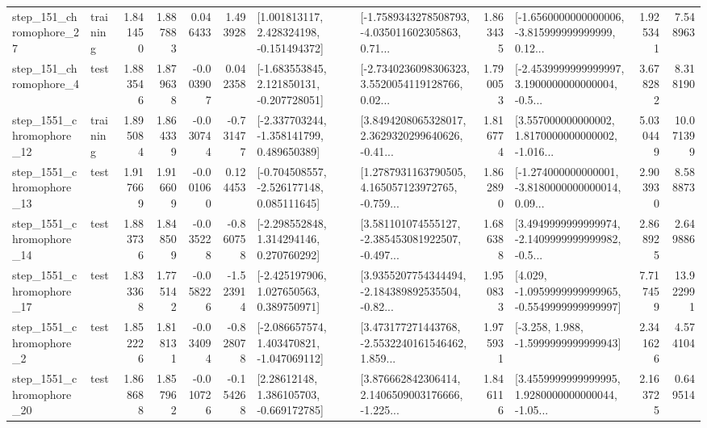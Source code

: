 \begin{tabular}{llrrrrllrlrr}
  step\_151\_chromophore\_27 &  training &      1.841450 &    1.887883 &      0.046433 &  1.493928 &    [1.001813117, 2.428324198, -0.151494372] &  [-1.7589343278508793, -4.035011602305863, 0.71... &       1.863435 &  [-1.6560000000000006, -3.815999999999999, 0.12... &            1.925341 &          7.548963 \\
   step\_151\_chromophore\_4 &      test &      1.883546 &    1.879638 &     -0.003907 &  0.042358 &   [-1.683553845, 2.121850131, -0.207728051] &  [-2.7340236098306323, 3.5520054119128766, 0.02... &       1.790053 &  [-2.4539999999999997, 3.1900000000000004, -0.5... &            3.678282 &          8.318190 \\
 step\_1551\_chromophore\_12 &  training &      1.895084 &    1.864339 &     -0.030744 & -0.731477 &   [-2.337703244, -1.358141799, 0.489650389] &  [3.8494208065328017, 2.3629320299640626, -0.41... &       1.816774 &  [3.557000000000002, 1.8170000000000002, -1.016... &            5.030449 &         10.071399 \\
 step\_1551\_chromophore\_13 &      test &      1.917669 &    1.916609 &     -0.001060 &  0.124453 &   [-0.704508557, -2.526177148, 0.085111645] &  [1.2787931163790505, 4.165057123972765, -0.759... &       1.862890 &  [-1.274000000000001, -3.8180000000000014, 0.09... &            2.903930 &          8.588873 \\
 step\_1551\_chromophore\_14 &      test &      1.883736 &    1.848509 &     -0.035228 & -0.860758 &    [-2.298552848, 1.314294146, 0.270760292] &  [3.581101074555127, -2.385453081922507, -0.497... &       1.686388 &  [3.4949999999999974, -2.1409999999999982, -0.5... &            2.868925 &          2.649886 \\
 step\_1551\_chromophore\_17 &      test &      1.833368 &    1.775142 &     -0.058226 & -1.523914 &    [-2.425197906, 1.027650563, 0.389750971] &  [3.9355207754344494, -2.184389892535504, -0.82... &       1.950833 &  [4.029, -1.0959999999999965, -0.5549999999999997] &            7.717459 &         13.922991 \\
  step\_1551\_chromophore\_2 &      test &      1.852226 &    1.818131 &     -0.034094 & -0.828078 &   [-2.086657574, 1.403470821, -1.047069112] &  [3.473177271443768, -2.5532240161546462, 1.859... &       1.975931 &               [-3.258, 1.988, -1.5999999999999943] &            2.341626 &          4.574104 \\
 step\_1551\_chromophore\_20 &      test &      1.868688 &    1.857962 &     -0.010726 & -0.154268 &     [2.28612148, 1.386105703, -0.669172785] &  [3.876662842306414, 2.1406509003176666, -1.225... &       1.846116 &  [3.4559999999999995, 1.9280000000000044, -1.05... &            2.163725 &          0.649514 \\

\end{tabular}
